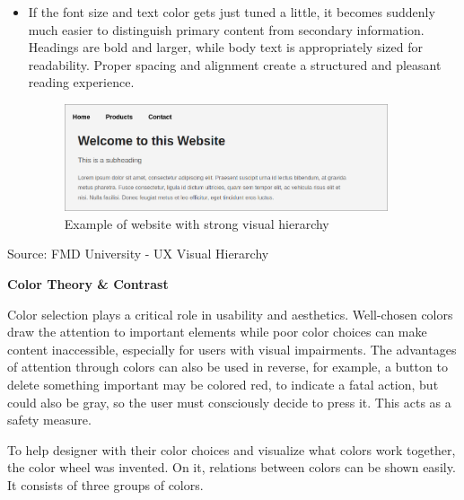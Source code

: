 \blankLine
\begin{itemize}
    \item {
    If the font size and text color gets just tuned a little, it becomes suddenly much easier to distinguish primary content from secondary information. Headings are bold and larger, while body text is appropriately sized for readability. Proper spacing and alignment create a structured and pleasant reading experience.
    \begin{figure} [H]
        \center
        \includegraphics [width=0.9\textwidth] {images/paul/usabilityExamples/goodVisualHierarchy.png}
        \caption{Example of website with strong visual hierarchy}
    \end{figure}
    }
\end{itemize}Source: FMD University - UX Visual Hierarchy

\blankLine

\textbf{Color Theory \& Contrast}

Color selection plays a critical role in usability and aesthetics. Well-chosen colors draw the attention to important elements while poor color choices can make content inaccessible, especially for users with visual impairments. The advantages of attention through colors can also be used in reverse, for example, a button to delete something important may be colored red, to indicate a fatal action, but could also be gray, so the user must consciously decide to press it. This acts as a safety measure. 

\blankLine

To help designer with their color choices and visualize what colors work together, the color wheel was invented. On it, relations between colors can be shown easily. It consists of three groups of colors. 

